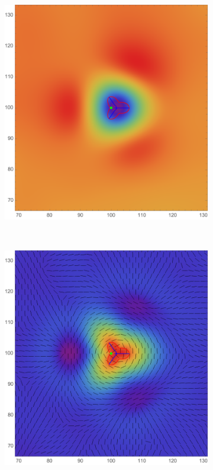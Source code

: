 \documentclass[a4paper, 11pt]{article}
\begin{document}
\begin{figure}
\centering
\begin{subfigure}[b]{0.32\textwidth}
\includegraphics[width=\textwidth]{Hyperbollic_mean_Phi}
\end{subfigure}~
\begin{subfigure}[b]{0.32\textwidth}
\includegraphics[width=\textwidth]{Hyperbollic_mean_L}

\end{subfigure}
\end{figure}
\end{document}
